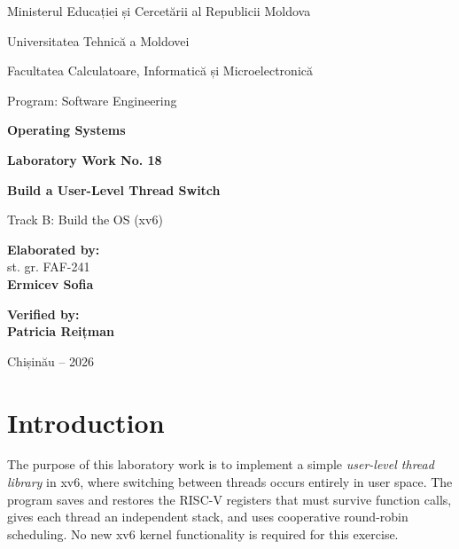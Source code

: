 \documentclass[12pt,a4paper]{article}
\begin{document}
\begin{titlepage}
\centering
\vspace*{0.55cm}
{\large Ministerul Educației și Cercetării al Republicii Moldova\par}
\vspace{0.2cm}
{\large Universitatea Tehnică a Moldovei\par}
\vspace{0.2cm}
{\large Facultatea Calculatoare, Informatică și Microelectronică\par}
\vspace{0.2cm}
{\large Program: Software Engineering\par}
\vspace{1.55cm}
{\Large\bfseries Operating Systems\par}
\vspace{0.65cm}
{\LARGE\bfseries Laboratory Work No. 18\par}
\vspace{0.35cm}
{\Large\bfseries Build a User-Level Thread Switch\par}
\vspace{0.20cm}
{\large Track B: Build the OS (xv6)\par}
\vfill
\begin{flushright}
\begin{minipage}{0.38\textwidth}
\raggedright
\textbf{Elaborated by:}\\
st. gr. FAF-241\\
\textbf{Ermicev Sofia}
\vspace{0.5cm}

\textbf{Verified by:}\\
\textbf{Patricia Reițman}
\end{minipage}
\end{flushright}
\vfill
{\large Chișinău -- 2026\par}
\end{titlepage}
\tableofcontents
\newpage

\section{Introduction}
The purpose of this laboratory work is to implement a simple \emph{user-level thread library} in xv6, where switching between threads occurs entirely in user space. The program saves and restores the RISC-V registers that must survive function calls, gives each thread an independent stack, and uses cooperative round-robin scheduling. No new xv6 kernel functionality is required for this exercise.
\end{document}
